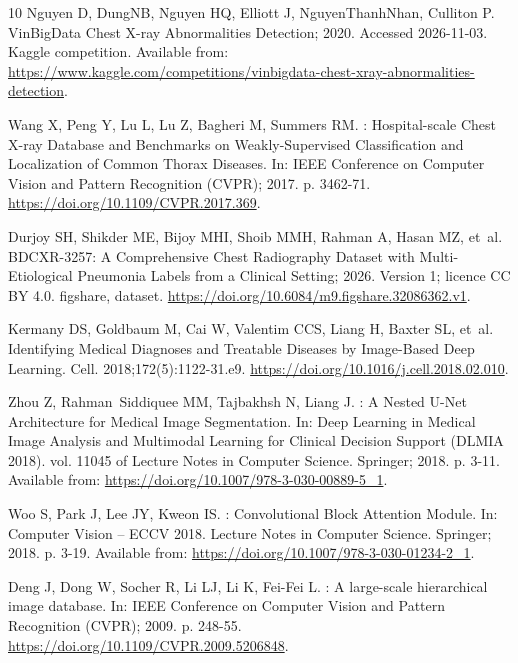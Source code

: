 \begin{thebibliography}{10}
Nguyen D, {DungNB}, Nguyen HQ, Elliott J, {NguyenThanhNhan}, Culliton P.
  {VinBigData} Chest {X}-ray Abnormalities Detection; 2020.
\newblock Accessed 2026-11-03.
\newblock Kaggle competition.
\newblock Available from:
  \url{https://www.kaggle.com/competitions/vinbigdata-chest-xray-abnormalities-detection}.

Wang X, Peng Y, Lu L, Lu Z, Bagheri M, Summers RM.
: Hospital-scale Chest {X}-ray Database and Benchmarks
  on Weakly-Supervised Classification and Localization of Common Thorax
  Diseases.
\newblock In: {IEEE} Conference on Computer Vision and Pattern Recognition
  ({CVPR}); 2017. p. 3462-71.
\newblock \url{https://doi.org/10.1109/CVPR.2017.369}.

Durjoy SH, Shikder ME, Bijoy MHI, Shoib MMH, Rahman A, Hasan MZ, et~al.
  {BDCXR-3257}: A Comprehensive Chest Radiography Dataset with
  Multi-Etiological Pneumonia Labels from a Clinical Setting; 2026.
\newblock Version 1; licence CC BY 4.0.
\newblock figshare, dataset.
\newblock \url{https://doi.org/10.6084/m9.figshare.32086362.v1}.

Kermany DS, Goldbaum M, Cai W, Valentim CCS, Liang H, Baxter SL, et~al.
\newblock Identifying Medical Diagnoses and Treatable Diseases by Image-Based
  Deep Learning.
\newblock Cell. 2018;172(5):1122-31.e9.
\newblock \url{https://doi.org/10.1016/j.cell.2018.02.010}.

Zhou Z, Rahman~Siddiquee MM, Tajbakhsh N, Liang J.
: A Nested {U-Net} Architecture for Medical Image
  Segmentation.
\newblock In: Deep Learning in Medical Image Analysis and Multimodal Learning
  for Clinical Decision Support ({DLMIA} 2018). vol. 11045 of Lecture Notes in
  Computer Science. Springer; 2018. p. 3-11.
\newblock Available from: \url{https://doi.org/10.1007/978-3-030-00889-5_1}.

Woo S, Park J, Lee JY, Kweon IS.
: Convolutional Block Attention Module.
\newblock In: Computer Vision -- {ECCV} 2018. Lecture Notes in Computer
  Science. Springer; 2018. p. 3-19.
\newblock Available from: \url{https://doi.org/10.1007/978-3-030-01234-2_1}.

Deng J, Dong W, Socher R, Li LJ, Li K, Fei-Fei L.
: A large-scale hierarchical image database.
\newblock In: {IEEE} Conference on Computer Vision and Pattern Recognition
  ({CVPR}); 2009. p. 248-55.
\newblock \url{https://doi.org/10.1109/CVPR.2009.5206848}.


\end{thebibliography}
